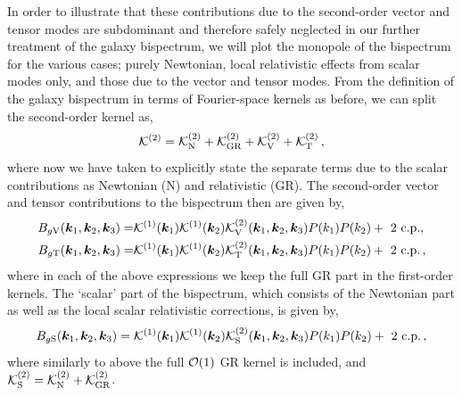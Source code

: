 In order to illustrate that these contributions due to the second-order vector and tensor modes are subdominant and therefore safely neglected in our further treatment of the galaxy bispectrum, we will plot the monopole of the bispectrum for the various cases; purely Newtonian, local relativistic effects from scalar modes only, and those due to the vector and tensor modes. 
From the definition of the galaxy bispectrum in terms of Fourier-space kernels as before, we can split the second-order kernel as, 
\begin{equation}
	\mathcal{K}^{(2)} = \mathcal{K}^{(2)}_{\mathrm{N}} + \mathcal{K}^{(2)}_\mathrm{GR} + \mathcal{K}^{(2)}_\mathrm{V} + \mathcal{K}^{(2)}_\mathrm{T}\,,
\end{equation}
where now we have taken to explicitly state the separate terms due to the scalar contributions as Newtonian (N) and relativistic (GR).
The second-order vector and tensor contributions to the bispectrum then are given by, 
\begin{align}
	B_{g\mathrm{V}}(\bm {k}_1,\bm {k}_2,\bm {k}_3) =& \mathcal{K}^{(1)}(\bm {k}_1) \mathcal{K}^{(1)}(\bm {k}_2) \mathcal{K}^{(2)}_\mathrm{V}(\bm {k}_1,\bm {k}_2,\bm {k}_3) P(k_1) P(k_2) + \text{ 2 c.p.}, \\
	B_{g\mathrm{T}}(\bm {k}_1,\bm {k}_2,\bm {k}_3) =& \mathcal{K}^{(1)}(\bm {k}_1) \mathcal{K}^{(1)}(\bm {k}_2) \mathcal{K}^{(2)}_\mathrm{T}(\bm {k}_1,\bm {k}_2,\bm {k}_3) P(k_1) P(k_2) + \text{ 2 c.p.}\,,
\end{align}
where in each of the above expressions we keep the full GR part in the first-order kernels. The `scalar' part of the bispectrum, which consists of the Newtonian part as well as the local scalar relativistic corrections, is given by, 
\begin{equation}
	B_{g\mathrm{S}}(\bm {k}_1,\bm {k}_2,\bm {k}_3) = \mathcal{K}^{(1)}(\bm {k}_1) \mathcal{K}^{(1)}(\bm {k}_2) \mathcal{K}^{(2)}_\mathrm{S}(\bm {k}_1,\bm {k}_2,\bm {k}_3) P(k_1) P(k_2) + \text{ 2 c.p.}\,,
\end{equation}
where similarly to above the full $\mathcal{O}(1)$ GR kernel is included, and $\mathcal{K}_\mathrm{S}^{(2)} = \mathcal{K}_{\mathrm{N}}^{(2)} + \mathcal{K}_{\mathrm{GR}}^{(2)}$.

